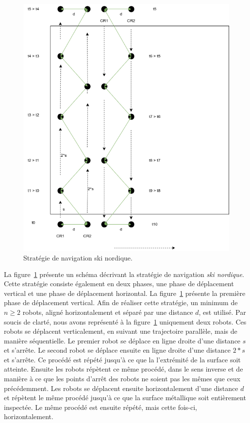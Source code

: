 \documentclass[francais,RandD]{rapportPFE}
\begin{document}
				\begin{figure}[h!]
					\centering
					\includegraphics[scale=0.5]{graphics/ski_nordique.png}
					\caption{Stratégie de navigation ski nordique.}
					\label{fig:ski_nordique1}
				\end{figure}

				La figure~\ref{fig:ski_nordique1} présente un schéma décrivant la stratégie de navigation \textit{ski nordique}.
				Cette stratégie consiste également en deux phases, une phase de déplacement vertical et une phase de déplacement horizontal.
				La figure~\ref{fig:ski_nordique1} présente la première phase de déplacement vertical.
				Afin de réaliser cette stratégie, un minimum de $n \ge 2$ robots, aligné horizontalement et séparé par une distance $d$, est utilisé.
				Par soucis de clarté, nous avons représenté à la figure~\ref{fig:ski_nordique1} uniquement deux robots.
				Ces robots se déplacent verticalement, en suivant une trajectoire parallèle, mais de manière séquentielle.
				Le premier robot se déplace en ligne droite d'une distance $s$ et s'arrête.
				Le second robot se déplace ensuite en ligne droite d'une distance $2 * s$ et s'arrête.
				Ce procédé est répété jusqu'à ce que la l'extrémité de la surface soit atteinte.
				Ensuite les robots répètent ce même procédé, dans le sens inverse et de manière à ce que les points d'arrêt des robots ne soient pas les mêmes que ceux précédemment.
				Les robots se déplacent ensuite horizontalement d'une distance $d$ et répètent le même procédé jusqu'à ce que la surface métallique soit entièrement inspectée.
				Le même procédé est ensuite répété, mais cette fois-ci, horizontalement.
\end{document}
